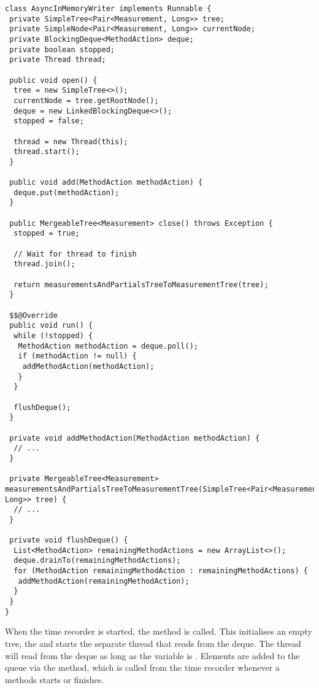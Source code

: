\noindent\begin{minipage}[c]{\linewidth}
\begin{lstlisting}[breaklines,caption={Async and in-memory writer},label=lis:timerecorderimplementation:asyncinmemorywriter]
class AsyncInMemoryWriter implements Runnable {
 private SimpleTree<Pair<Measurement, Long>> tree;
 private SimpleNode<Pair<Measurement, Long>> currentNode;
 private BlockingDeque<MethodAction> deque;
 private boolean stopped;
 private Thread thread;
 
 public void open() {
  tree = new SimpleTree<>();
  currentNode = tree.getRootNode();
  deque = new LinkedBlockingDeque<>();
  stopped = false;
 
  thread = new Thread(this);
  thread.start();
 }
 
 public void add(MethodAction methodAction) {
  deque.put(methodAction);
 }
 
 public MergeableTree<Measurement> close() throws Exception {
  stopped = true;
 
  // Wait for thread to finish
  thread.join();
 
  return measurementsAndPartialsTreeToMeasurementTree(tree);
 }
 
 $$@Override
 public void run() {
  while (!stopped) {
   MethodAction methodAction = deque.poll();
   if (methodAction != null) {
    addMethodAction(methodAction);
   }
  }
 
  flushDeque();
 }
 
 private void addMethodAction(MethodAction methodAction) {
  // ...
 }
 
 private MergeableTree<Measurement> measurementsAndPartialsTreeToMeasurementTree(SimpleTree<Pair<Measurement, Long>> tree) {
  // ...
 }
 
 private void flushDeque() {
  List<MethodAction> remainingMethodActions = new ArrayList<>();
  deque.drainTo(remainingMethodActions);
  for (MethodAction remainingMethodAction : remainingMethodActions) {
   addMethodAction(remainingMethodAction);
  }
 }
}
\end{lstlisting}
\end{minipage}

\noindent When the time recorder is started, the  method is called. This initialises an empty tree, the  and starts the separate thread that reads from the deque. The thread will read from the deque as long as the variable  is . Elements are added to the queue via the  method, which is called from the time recorder whenever a methods starts or finishes.

